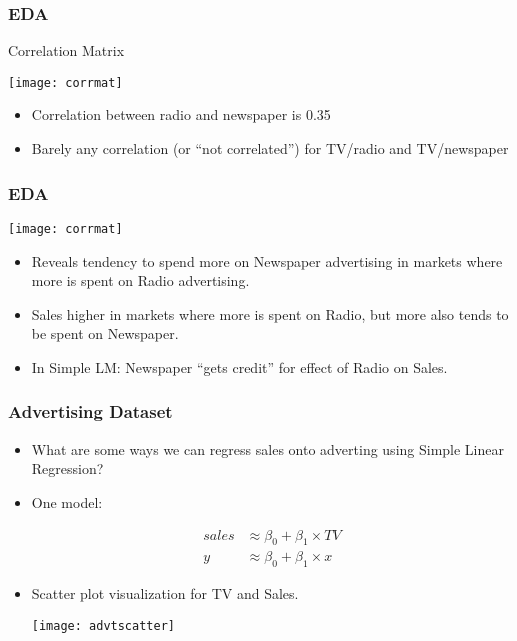 \begin{frame}[fragile]\frametitle{EDA}
Correlation Matrix

\begin{center}
\texttt{[image: corrmat]}
\end{center}
\begin{itemize}
\item Correlation between radio and newspaper is 0.35
\item Barely any correlation (or ``not correlated'') for TV/radio and TV/newspaper
\end{itemize}
\end{frame}

\begin{frame}[fragile]\frametitle{EDA}
\begin{center}
\texttt{[image: corrmat]}
\end{center}
\begin{itemize}
\item Reveals tendency to spend more on Newspaper advertising in markets where more is spent on Radio advertising.
\item Sales higher in markets where more is spent on Radio, but more also tends to be spent on Newspaper.
\item In Simple LM: Newspaper ``gets credit'' for effect of Radio on Sales.
\end{itemize}
\end{frame}
\begin{frame}[fragile]\frametitle{Advertising Dataset}
\begin{itemize}
\item What are some ways we can regress sales onto adverting using Simple Linear Regression?
\item One model:

\begin{eqnarray*}
sales & \approx \beta_0 +  \beta_1 \times TV \\
y & \approx \beta_0 + \beta_1 \times x
\end{eqnarray*}

\item Scatter plot visualization for TV and Sales.
\begin{center}
\texttt{[image: advtscatter]}
\end{center}
\end{itemize}
\end{frame}

